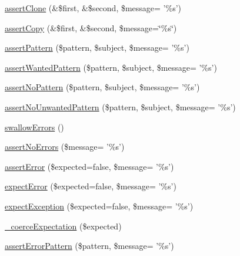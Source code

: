 \begin{DoxyCompactItemize}
\hyperlink{class_unit_test_case_aa36296ec9f5b8f98ec70dd1903fb2ef5}{assertClone} (\&\$first, \&\$second, \$message= '\%s')
\item 
\hyperlink{class_unit_test_case_a457392b00e8cfb893e519e8bc4fa1749}{assertCopy} (\&\$first, \&\$second, \$message=\char`\"{}\%s\char`\"{})
\item 
\hyperlink{class_unit_test_case_afddf643f99b03b10e9130adef47ffb45}{assertPattern} (\$pattern, \$subject, \$message= '\%s')
\item 
\hyperlink{class_unit_test_case_af90c866edd54a7db648e9e1e95043209}{assertWantedPattern} (\$pattern, \$subject, \$message= '\%s')
\item 
\hyperlink{class_unit_test_case_a0260f53af3df61f9a066a172b0848e6e}{assertNoPattern} (\$pattern, \$subject, \$message= '\%s')
\item 
\hyperlink{class_unit_test_case_a89d3dc4c132a2169978e08835f3e7764}{assertNoUnwantedPattern} (\$pattern, \$subject, \$message= '\%s')
\item 
\hyperlink{class_unit_test_case_ac3764e45c5824f0ce866efef48b39752}{swallowErrors} ()
\item 
\hyperlink{class_unit_test_case_ade3339d36a563bef91ae2e413a94d143}{assertNoErrors} (\$message= '\%s')
\item 
\hyperlink{class_unit_test_case_afca81e1dd754acc0d6a812e48faeb763}{assertError} (\$expected=false, \$message= '\%s')
\item 
\hyperlink{class_unit_test_case_aca84304870f9ce9c5b86fd1026e947dd}{expectError} (\$expected=false, \$message= '\%s')
\item 
\hyperlink{class_unit_test_case_a7653373ecf57e9badb0de44097a76fe3}{expectException} (\$expected=false, \$message= '\%s')
\item 
\hyperlink{class_unit_test_case_a643f146bf847fb7e1cabe481ea10596d}{\_\-coerceExpectation} (\$expected)
\item 
\hyperlink{class_unit_test_case_a145f3c7e61fd66e2e2d4a6bb87f58ea0}{assertErrorPattern} (\$pattern, \$message= '\%s')
\end{DoxyCompactItemize}


